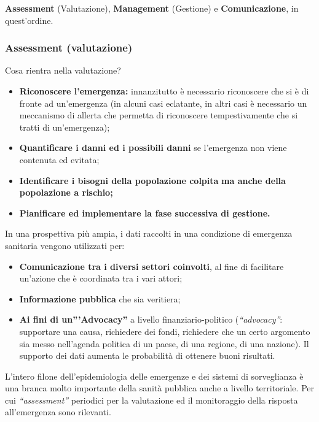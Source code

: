 \textbf{Assessment} (Valutazione), \textbf{Management} (Gestione) e
\textbf{Comunicazione}, in quest'ordine.

\subsubsection{Assessment (valutazione)}

Cosa rientra nella valutazione?

\begin{itemize}
\item
  \textbf{Riconoscere l'emergenza:} innanzitutto è necessario
  riconoscere che si è di fronte ad un'emergenza (in alcuni casi
  eclatante, in altri casi è necessario un meccanismo di allerta che
  permetta di riconoscere tempestivamente che si tratti di
  un'emergenza);
\item
  \textbf{Quantificare i danni ed i possibili danni} se l'emergenza non
  viene contenuta ed evitata;
\item
  \textbf{Identificare i bisogni della popolazione colpita} \textbf{ma
  anche della popolazione a rischio;}
\item
  \textbf{Pianificare ed implementare la fase successiva di gestione.}
\end{itemize}

In una prospettiva più ampia, i dati raccolti in una condizione di
emergenza sanitaria vengono utilizzati per:

\begin{itemize}
\item
  \textbf{Comunicazione tra i diversi settori coinvolti}, al fine di
  facilitare un'azione che è coordinata tra i vari attori;
\item
  \textbf{Informazione pubblica} che sia veritiera;
\item
  \textbf{Ai fini di un'''Advocacy''} a livello finanziario-politico
  (\emph{``advocacy''}: supportare una causa, richiedere dei fondi,
  richiedere che un certo argomento sia messo nell'agenda politica di un
  paese, di una regione, di una nazione). Il supporto dei dati aumenta
  le probabilità di ottenere buoni risultati.
\end{itemize}

L'intero filone dell'epidemiologia delle emergenze e dei sistemi di
sorveglianza è una branca molto importante della sanità pubblica anche a
livello territoriale. Per cui \emph{``assessment''} periodici per la
valutazione ed il monitoraggio della risposta all'emergenza sono
rilevanti.

